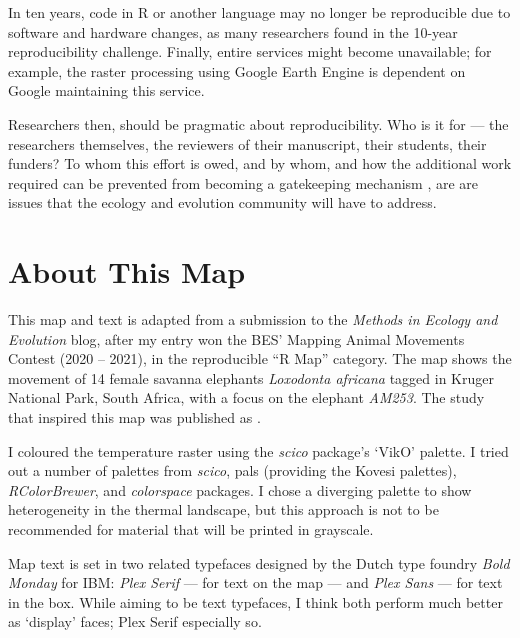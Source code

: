 \begin{description}
	In ten years, code in R or another language may no longer be reproducible due to software and hardware changes, as many researchers found in the 10-year reproducibility challenge. Finally, entire services might become unavailable; for example, the raster processing using Google Earth Engine is dependent on Google maintaining this service.

	Researchers then, should be pragmatic about reproducibility. Who is it for — the researchers themselves, the reviewers of their manuscript, their students, their funders?
	To whom this effort is owed, and by whom, and how the additional work required can be prevented from becoming a gatekeeping mechanism \citep{finley,murphy2020}, are are issues that the ecology and evolution community will have to address.
\end{description}

{ \begin{center}  \end{center} }

\section*{About This Map}

This map and text is adapted from a submission to the \textit{Methods in Ecology and Evolution} blog, after my entry won the BES' Mapping Animal Movements Contest (2020 -- 2021), in the reproducible ``R Map'' category. The map shows the movement of 14 female savanna elephants \textit{Loxodonta africana} tagged in Kruger National Park, South Africa, with a focus on the elephant \emph{AM253}.
The study that inspired this map was published as \citet{thaker2019} .

I coloured the temperature raster using the \textit{scico} package's `VikO' palette. I tried out a number of palettes from \textit{scico}, pals (providing the Kovesi palettes), \textit{RColorBrewer}, and \textit{colorspace} packages. I chose a diverging palette to show heterogeneity in the thermal landscape, but this approach is not to be recommended for material that will be printed in grayscale.

Map text is set in two related typefaces designed by the Dutch type foundry \emph{Bold Monday} for IBM: \emph{Plex Serif} --- for text on the map --- and \emph{Plex Sans} --- for text in the box.
While aiming to be text typefaces, I think both perform much better as `display' faces; Plex Serif especially so.

{ \begin{center}  \end{center} }



\endgroup

\afterpage{\nopagecolor}
\pagestyle{scrheadings}
